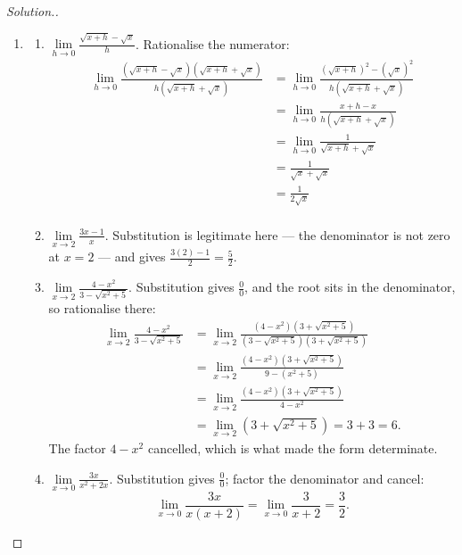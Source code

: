 \documentclass[11pt,a4paper]{article}
\theoremstyle{definition}
\newenvironment{solution}
  {\renewcommand{\qedsymbol}{}\begin{proof}[\textit{Solution}.]}
  {\end{proof}}
\begin{document}
\begin{solution}


\begin{enumerate}
\item[]
\begin{enumerate}
       \item $\lim\limits_{h\longrightarrow 0}\frac{\sqrt{x+h}-\sqrt{x}}{h}$. Rationalise the numerator:
\begin{align*}
\lim_{h\longrightarrow 0}\frac{(\sqrt{x+h}-\sqrt{x})(\sqrt{x+h}+\sqrt{x})}{h(\sqrt{x+h}+\sqrt{x})} & =\lim_{h\longrightarrow 0}\frac{(\sqrt{x+h})^2-(\sqrt{x})^2}{h(\sqrt{x+h}+\sqrt{x})}\\
& =\lim_{h\longrightarrow 0}\frac{x+h-x}{h(\sqrt{x+h}+\sqrt{x})}\\
& =\lim_{h\longrightarrow 0}\frac{1}{\sqrt{x+h}+\sqrt{x}}\\
& = \frac{1}{\sqrt{x}+\sqrt{x}}\\
& = \frac{1}{2\sqrt{x}}\\
\end{align*}

\item $\lim\limits_{x\longrightarrow 2}\frac{3x-1}{x}$. Substitution is legitimate
here --- the denominator is not zero at $x=2$ --- and gives
$\frac{3(2)-1}{2}=\frac{5}{2}$.

\item $\lim\limits_{x\longrightarrow 2}\frac{4-x^2}{3-\sqrt{x^2+5}}$. Substitution
gives $\frac{0}{0}$, and the root sits in the denominator, so rationalise there:
\begin{align*}
\lim_{x\to 2}\frac{4-x^{2}}{3-\sqrt{x^{2}+5}}
 &=\lim_{x\to 2}\frac{\left(4-x^{2}\right)\left(3+\sqrt{x^{2}+5}\right)}
                     {\left(3-\sqrt{x^{2}+5}\right)\left(3+\sqrt{x^{2}+5}\right)}\\
 &=\lim_{x\to 2}\frac{\left(4-x^{2}\right)\left(3+\sqrt{x^{2}+5}\right)}{9-\left(x^{2}+5\right)}\\
 &=\lim_{x\to 2}\frac{\left(4-x^{2}\right)\left(3+\sqrt{x^{2}+5}\right)}{4-x^{2}}\\
 &=\lim_{x\to 2}\left(3+\sqrt{x^{2}+5}\right)=3+3=6 .
\end{align*}
The factor $4-x^{2}$ cancelled, which is what made the form determinate.

\item $\lim\limits_{x\longrightarrow 0}\frac{3x}{x^2+2x}$. Substitution gives
$\frac{0}{0}$; factor the denominator and cancel:
$$\lim_{x\to 0}\frac{3x}{x(x+2)}=\lim_{x\to 0}\frac{3}{x+2}=\frac{3}{2} .$$
\end{enumerate}
\end{enumerate}
\end{solution}
\end{document}
